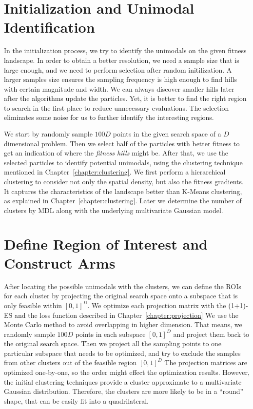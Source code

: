 \section{Initialization and Unimodal Identification}

In the initialization process, we try to identify the unimodals on the given fitness landscape.
In order to obtain a better resolution, we need a sample size that is large enough, and we need to perform selection after random initilization.
A larger samples size ensures the sampling frequency is high enough to find hills with certain magnitude and width.
We can always discover smaller hills later after the algorithms update the particles.
Yet, it is better to find the right region to search in the first place to reduce unnecessary evaluations.
The selection eliminates some noise for us to further identify the interesting regions.

We start by randomly sample $100D$ points in the given search space of a $D$ dimensional problem. 
Then we select half of the particles with better fitness to get an indication of where the \textit{fitness hills} might be.
After that, we use the selected particles to identify potential unimodals,
using the clustering technique mentioned in Chapter~\ref{chapter:clustering}.
We first perform a hierarchical clustering to consider not only the spatial density, but also the fitness gradients.
It captures the characteristics of the landscape better than K-Means clustering, as explained in Chapter~\ref{chapter:clustering}.
Later we determine the number of clusters by MDL along with the underlying multivariate Gaussian model.



\section{Define Region of Interest and Construct Arms}

After locating the possible unimodals with the clusters, we can define the ROIs for each cluster 
by projecting the original search space onto a subspace that is only feasible within $[0,1]^D$.
We optimize each projection matrix with the (1+1)-ES and the loss function described in Chapter~\ref{chapter:projection} 
We use the Monte Carlo method to avoid overlapping in higher dimension.
That means, we randomly sample $100D$ points in each subspace $[0,1]^D$ and project them back to the original search space.
Then we project all the sampling points to one particular subspace that needs to be optimized, 
and try to exclude the samples from other clusters out of the feasible region $[0,1]^D$
The projection matrices are optimized one-by-one, so the order might effect the optimization results.
However, the initial clustering techniques provide a cluster approximate to a multivariate Gaussian distribution.
Therefore, the clusters are more likely to be in a ``round'' shape, that can be easily fit into a quadrilateral.  


